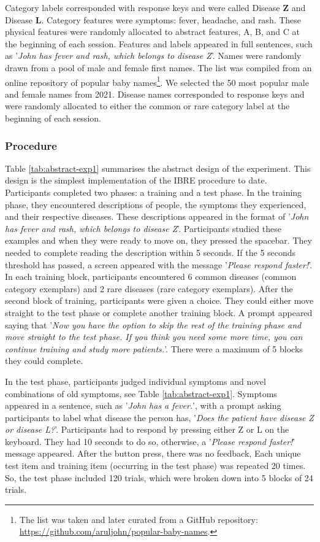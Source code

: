\documentclass[10pt,letterpaper]{article}
\begin{document}
Category labels corresponded with response keys and were called Disease \textbf{Z} and Disease \textbf{L}.
Category features were symptoms: fever, headache, and rash.
These physical features were randomly allocated to abstract features, A, B, and C at the beginning of each session.
Features and labels appeared in full sentences, such as '\textit{John has fever and rash, which belongs to disease Z}'.
Names were randomly drawn from a pool of male and female first names.
The list was compiled from an online repository of popular baby names\footnote[1]{The list was taken and later curated from a GitHub repository: \href{https://github.com/aruljohn/popular-baby-names}{https://github.com/aruljohn/popular-baby-names}.}.
We selected the 50 most popular male and female names from 2021.
Disease names corresponded to response keys and were randomly allocated to either the common or rare category label at the beginning of each session.

\subsubsection{Procedure}

Table \ref{tab:abstract-exp1} summarises the abstract design of the experiment.
This design is the simplest implementation of the IBRE procedure to date.
Participants completed two phases: a training and a test phase.
In the training phase, they encountered descriptions of people, the symptoms they experienced, and their respective diseases.
These descriptions appeared in the format of '\textit{John has fever and rash, which belongs to disease Z}'.
Participants studied these examples and when they were ready to move on, they pressed the spacebar.
They needed to complete reading the description within 5 seconds.
If the 5 seconds threshold has passed, a screen appeared with the message '\textit{Please respond faster!}'.
In each training block, participants encountered 6 common diseases (common category exemplars) and 2 rare diseases (rare category exemplars).
After the second block of training, participants were given a choice.
They could either move straight to the test phase or complete another training block.
A prompt appeared saying that '\textit{Now you have the option to skip the rest of the training phase and move straight to the test phase. If you think you need some more time, you can continue training and study more patients.}'.
There were a maximum of 5 blocks they could complete.

In the test phase, participants judged individual symptoms and novel combinations of old symptoms, see Table \ref*{tab:abstract-exp1}.
Symptoms appeared in a sentence, such as '\textit{John has a fever.}', with a prompt asking participants to label what disease the person has, '\textit{Does the patient have disease Z or disease L?}'.
Participants had to respond by pressing either Z or L on the keyboard.
They had 10 seconds to do so, otherwise, a '\textit{Please respond faster!}' message appeared.
After the button press, there was no feedback,
Each unique test item and training item (occurring in the test phase) was repeated 20 times.
So, the test phase included 120 trials, which were broken down into 5 blocks of 24 trials.
\end{document}
